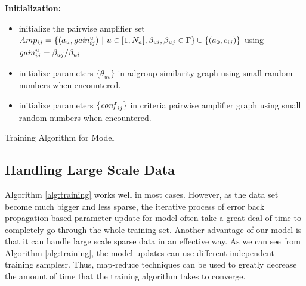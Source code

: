 \begin{algorithm}
  \textbf{Initialization:}\\
  \begin{itemize}
  \item initialize the pairwise amplifier set
    $Amp_{ij}=\{(a_u,\mathit{gain}^{u}_{ij})~|~u\in
    [1,N_a],\beta_{ui},\beta_{uj}\in \Gamma\} \cup \{(a_0,c_{ij})\}$
    using $\mathit{gain}^{u}_{ij}=\beta_{uj}/\beta_{ui}$
  \item initialize parameters $\{\theta_{uv}\}$ in adgroup similarity
    graph using small random numbers when encountered.
  \item initialize parameters $\{\mathit{conf}_{ij}\}$ in criteria pairwise
    amplifier graph using small random numbers when encountered.
  \end{itemize}
  \caption{Training Algorithm for {\sppan} Model}
  \label{alg:training}
\end{algorithm}

\subsection{Handling Large Scale  Data}
Algorithm \ref{alg:training} works well in most cases. However, as the
data set become much bigger and less sparse, the iterative process of
error back propagation based parameter update for {\sppan} model often
take a great deal of time to completely go through the whole training
set.  Another advantage of our model is that it can handle large scale
sparse data in an effective way. As we can see from Algorithm
\ref{alg:training}, the {\sppan} model updates can use different
independent training samplesr. Thus, map-reduce techniques can be used
to greatly decrease the amount of time that the training algorithm
takes to converge.


